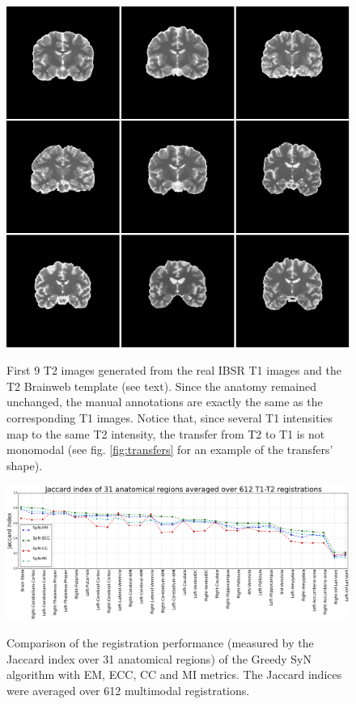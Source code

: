 \begin{figure}[H]
\centering
\includegraphics[width=1.0\linewidth]{./images/semi_synthetic.png}\\
\caption{First 9 T2 images generated from the real IBSR T1 images and the T2 Brainweb template (see text). Since the anatomy remained unchanged, the manual annotations are exactly
the same as the corresponding T1 images. Notice that, since several T1 intensities map to the same T2 intensity, the transfer from T2 to T1 is not monomodal
(see fig. \ref{fig:transfers} for an example of the transfers' shape).}
\label{fig:semi_synthetic}
\end{figure}




\begin{figure}[H]
\centering
\includegraphics[width=1.0\linewidth]{./images/multi_lines_seg.png}\\
\caption{Comparison of the registration performance (measured by the Jaccard index over 31 anatomical regions) of the Greedy SyN algorithm with EM, ECC, CC and MI metrics. The Jaccard
indices were averaged over 612 multimodal registrations.}
\label{fig:multi_seg}
\end{figure}

